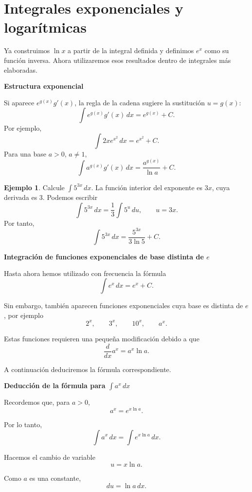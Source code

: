 \documentclass[12pt]{article}
\theoremstyle{definition}
\newtheorem{ejemplo}[teorema]{Ejemplo}
\theoremstyle{remark}
\begin{document}
\section{Integrales exponenciales y logarítmicas}
Ya construimos $\ln x$ a partir de la integral definida y definimos $e^x$ como su función inversa. Ahora utilizaremos esos resultados dentro de integrales más elaboradas.

\textbf{Estructura exponencial}



Si aparece $e^{g(x)}g'(x)$, la regla de la cadena sugiere la sustitución $u=g(x)$:
\[
\boxed{\int e^{g(x)}g'(x)\,dx=e^{g(x)}+C.}
\]
Por ejemplo,
\[
\int 2x e^{x^2}\,dx=e^{x^2}+C.
\]
Para una base $a>0$, $a\neq1$,
\[
\boxed{\int a^{g(x)}g'(x)\,dx=\frac{a^{g(x)}}{\ln a}+C.}
\]

\begin{ejemplo}
Calcule $\int5^{3x}\,dx$.
La función interior del exponente es $3x$, cuya derivada es $3$. Podemos escribir
\[
\int5^{3x}\,dx=\frac13\int 5^u\,du,
\qquad u=3x.
\]
Por tanto,
\[
\boxed{\int5^{3x}\,dx=\frac{5^{3x}}{3\ln5}+C.}
\]
\end{ejemplo}
\textbf{Integración de funciones exponenciales de base distinta de \(e\)}

Hasta ahora hemos utilizado con frecuencia la fórmula
\[
\int e^x\,dx=e^x+C.
\]

Sin embargo, también aparecen funciones exponenciales cuya base es distinta
de \(e\), por ejemplo
\[
2^x,\qquad 3^x,\qquad 10^x,\qquad a^x.
\]

Estas funciones requieren una pequeña modificación debido a que
\[
\frac{d}{dx}a^x=a^x\ln a.
\]

A continuación deduciremos la fórmula correspondiente.

\textbf{Deducción de la fórmula para \(\int a^x\,dx\)}

Recordemos que, para \(a>0\),
\[
a^x=e^{x\ln a}.
\]

Por lo tanto,
\[
\int a^x\,dx
=
\int e^{x\ln a}\,dx.
\]

Hacemos el cambio de variable
\[
u=x\ln a.
\]

Como \(a\) es una constante,
\[
du=\ln a\,dx.
\]
\end{document}
